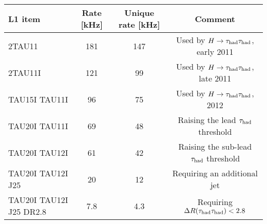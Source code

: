 \begin{tabular}{lccc}
  \hline\hline
  L1 item     & Rate [kHz] & Unique rate [kHz] & Comment \\
  \hline
  2TAU11                  & 181   & 147   & Used by $H\rightarrow\tau_\text{had}\tau_\text{had}$, early 2011 \\
  2TAU11I                 & 121   &  99   & Used by $H\rightarrow\tau_\text{had}\tau_\text{had}$, late 2011 \\
  TAU15I TAU11I           &  96   &  75   & Used by $H\rightarrow\tau_\text{had}\tau_\text{had}$, 2012 \\
  TAU20I TAU11I           &  69   &  48   & Raising the lead $\tau_\text{had}$ threshold \\
  TAU20I TAU12I           &  61   &  42   & Raising the sub-lead $\tau_\text{had}$ threshold \\
  TAU20I TAU12I J25       &  20   &  12   & Requiring an additional jet \\
  TAU20I TAU12I J25 DR2.8 &   7.8 &   4.3 & Requiring $\Delta R(\tau_\text{had}\tau_\text{had}) < 2.8$ \\
  \hline\hline
\end{tabular}


